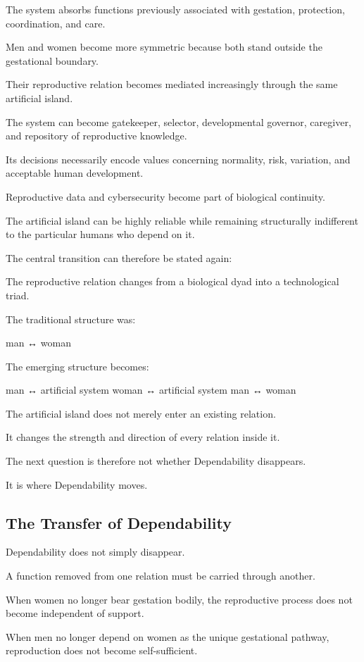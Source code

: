 The system absorbs functions previously associated with gestation, protection, coordination, and care.

Men and women become more symmetric because both stand outside the gestational boundary.

Their reproductive relation becomes mediated increasingly through the same artificial island.

The system can become gatekeeper, selector, developmental governor, caregiver, and repository of reproductive knowledge.

Its decisions necessarily encode values concerning normality, risk, variation, and acceptable human development.

Reproductive data and cybersecurity become part of biological continuity.

The artificial island can be highly reliable while remaining structurally indifferent to the particular humans who depend on it.

The central transition can therefore be stated again:

The reproductive relation changes from a biological dyad into a technological triad.

The traditional structure was:

man ↔ woman

The emerging structure becomes:

man ↔ artificial system
woman ↔ artificial system
man ↔ woman

The artificial island does not merely enter an existing relation.

It changes the strength and direction of every relation inside it.

The next question is therefore not whether Dependability disappears.

It is where Dependability moves.

\subsection*{\textbf{The Transfer of Dependability}}


Dependability does not simply disappear.

A function removed from one relation must be carried through another.

When women no longer bear gestation bodily, the reproductive process does not become independent of support.

When men no longer depend on women as the unique gestational pathway, reproduction does not become self-sufficient.

